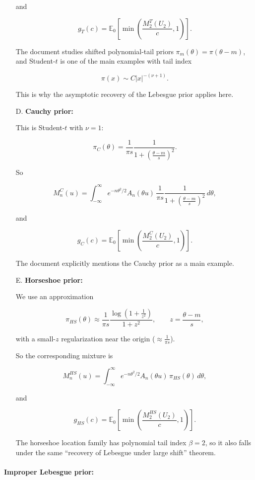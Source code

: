 \documentclass{article}%
\begin{document}
\begin{itemize}
and

\[
g_T(c)
=
\mathbb E_0\!\left[
\min\!\left(\frac{M_2^T(U_2)}{c},1\right)
\right].
\]

The document studies shifted polynomial-tail priors \(\pi_m(\theta)=\pi(\theta-m)\), and Student-\(t\) is one of the main examples with tail index

\[
\pi(x)\sim C|x|^{-(\nu+1)}.
\]

This is why the asymptotic recovery of the Lebesgue prior applies here.


\item[D.] \textbf{Cauchy prior:}

This is Student-\(t\) with \(\nu=1\):

\[
\pi_C(\theta)
=
\frac{1}{\pi s}\frac{1}{1+\left(\frac{\theta-m}{s}\right)^2}.
\]

So

\[
M_n^C(u)
=
\int_{-\infty}^\infty
e^{-n\theta^2/2}A_n(\theta u)\,
\frac{1}{\pi s}\frac{1}{1+\left(\frac{\theta-m}{s}\right)^2}
\,d\theta,
\]

and

\[
g_C(c)
=
\mathbb E_0\!\left[
\min\!\left(\frac{M_2^C(U_2)}{c},1\right)
\right].
\]

The document explicitly mentions the Cauchy prior as a main example.


\item[E.] \textbf{Horseshoe prior:}

We use an approximation

\[
\pi_{HS}(\theta)
\approx
\frac{1}{\pi s}
\frac{\log\!\left(1+\frac{1}{z^2}\right)}{1+z^2},
\qquad
z=\frac{\theta-m}{s},
\]

with a small-\(z\) regularization near the origin ($\approx \frac{1}{\pi s}$).

So the corresponding mixture is

\[
M_n^{HS}(u)
=
\int_{-\infty}^\infty
e^{-n\theta^2/2}A_n(\theta u)\,\pi_{HS}(\theta)\,d\theta,
\]

and

\[
g_{HS}(c)
=
\mathbb E_0\!\left[
\min\!\left(\frac{M_2^{HS}(U_2)}{c},1\right)
\right].
\]

The horseshoe location family has polynomial tail index \(\beta=2\), so it also falls under the same “recovery of Lebesgue under large shift” theorem.

\end{itemize}

\paragraph{Improper Lebesgue prior:}
\end{document}
